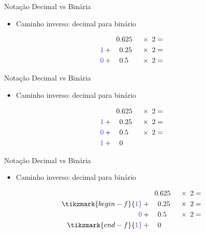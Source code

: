 \documentclass[t, aspectratio=169]{beamer}
\begin{document}
\begin{frame}[label={sec:orgb5f93fd}]{Notação Decimal vs Binária}
\begin{itemize}
\item Caminho inverso: decimal para binário
\end{itemize}

\begin{alignat*}{2}
                             &\phantom{+ \quad}0.625&& \; \times\; 2 = \\
    {\color{blue!80}1} &+ \quad 0.25&& \; \times\; 2 = \\
    {\color{blue!80}0} &+ \quad 0.5&& \; \times\; 2 = \\
\end{alignat*}
\end{frame}

\begin{frame}[label={sec:orgfa5cbc3}]{Notação Decimal vs Binária}
\begin{itemize}
\item Caminho inverso: decimal para binário
\end{itemize}

\begin{alignat*}{2}
                             &\phantom{+ \quad}0.625&& \; \times\; 2 = \\
    {\color{blue!80}1} &+ \quad 0.25&& \; \times\; 2 = \\
    {\color{blue!80}0} &+ \quad 0.5&& \; \times\; 2 = \\
    {\color{blue!80}1} & +\quad 0\\
\end{alignat*}
\end{frame}

\begin{frame}[label={sec:org8f1cd67}]{Notação Decimal vs Binária}
\begin{itemize}
\item Caminho inverso: decimal para binário
\end{itemize}

\begin{alignat*}{2}
                             &\phantom{+ \quad}0.625&& \; \times\; 2 = \\
    \tikzmark{begin-f}{\color{blue!80}1} &+ \quad 0.25&& \; \times\; 2 = \\
    {\color{blue!80}0} &+ \quad 0.5&& \; \times\; 2 = \\
    \tikzmark{end-f}{\color{blue!80}1} & +\quad 0\\
\end{alignat*}

\end{frame}
\end{document}
